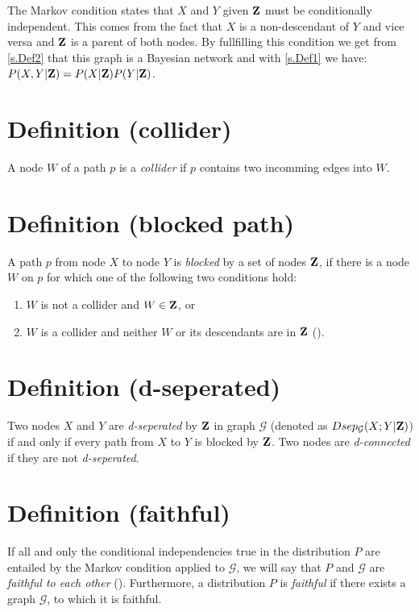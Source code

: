 		The Markov condition states that $X$ and $Y$ given ${\textbf{Z}}$ must be conditionally independent. This comes from the fact that $X$ is a non-descendant of $Y$ and vice versa and ${\textbf{Z}}$ is a parent of both nodes. By fullfilling this condition we get from \autoref{s.Def2} that this graph is a Bayesian network and with \autoref{s.Def1} we have: $P(X , Y|{\textbf{Z}}) = P(X|{\textbf{Z}})P(Y|{\textbf{Z}})$.

	\section*{Definition (collider)} \label{s.Def4}

		A node $W$ of a path $p$ is a \textit{collider} if $p$ contains two incomming edges into $W$.

	\section*{Definition (blocked path)} \label{s.Def5}

		A path $p$ from node $X$ to node $Y$ is \textit{blocked} by a set of nodes ${\textbf{Z}}$, if there is a node $W$ on $p$ for which one of the following two conditions hold:

		\begin{enumerate}
			\item $W$ is not a collider and $W \in {\textbf{Z}}$, or
			\item $W$ is a collider and neither $W$ or its descendants are in ${\textbf{Z}}$ (\cite{P88}).
		\end{enumerate}

	\section*{Definition (d-seperated)} \label{s.Def6}

		Two nodes $X$ and $Y$ are \textit{d-seperated} by ${\textbf{Z}}$ in graph $\mathcal{G}$ (denoted as $Dsep_{\mathcal{G}}(X;Y|{\textbf{Z}})$) if and only if every path from $X$ to $Y$ is blocked by ${\textbf{Z}}$. Two nodes are \textit{d-connected} if they are not \textit{d-seperated}.

	\section*{Definition (faithful)} \label{s.Def7}

		If all and only the conditional independencies true in the distribution $P$ are entailed by the Markov condition applied to $\mathcal{G}$, we will say that $P$ and $\mathcal{G}$ are \textit{faithful to each other} (\cite{SGSN}). Furthermore, a distribution $P$ is \textit{faithful} if there exists a graph $\mathcal{G}$, to which it is faithful.

